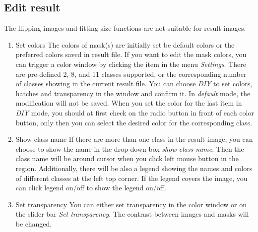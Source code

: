 \documentclass[12pt]{article}
\begin{document}
\subsection{Edit result}
The flipping images and fitting size functions are not suitable for result images. 
\begin{enumerate}
	
	\item Set colors
	\newline The colors of mask(s) are initially set be default colors or the preferred colors saved in result file. If you want to edit the mask colors, you can trigger a color window by clicking the item in the menu \textit{Settings}. There are pre-defined 2, 8, and 11 classes supported, or the corresponding number of classes showing in the current result file. You can choose \textit{DIY} to set colors, hatches and transparency in the window and confirm it. In \textit{default} mode, the modification will not be saved. When you set the color for the last item in \textit{DIY} mode, you should at first check on the radio button in front of each color button, only then you can select the desired color for the corresponding class.
	\item Show class name
	\newline If there are more than one class in the result image, you can choose to show the name in the drop down box \textit{show class name}. Then the class name will be around cursor when you click left mouse button in the region. Additionally, there will be also a legend showing the names and colors of different classes at the left top corner. If the legend covers the image, you can click legend on/off to show the legend on/off.
	\item Set transparency
	You can either set transparency in the color window or on the slider bar \textit{Set transparency}. The contrast between images and masks will be changed.
\end{enumerate}
\end{document}
